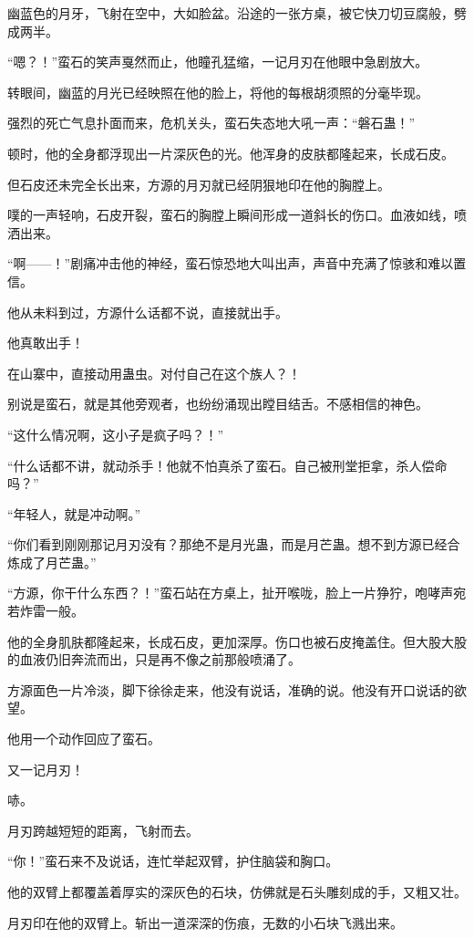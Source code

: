 \begin{this_body}
幽蓝色的月牙，飞射在空中，大如脸盆。沿途的一张方桌，被它快刀切豆腐般，劈成两半。

“嗯？！”蛮石的笑声戛然而止，他瞳孔猛缩，一记月刃在他眼中急剧放大。

转眼间，幽蓝的月光已经映照在他的脸上，将他的每根胡须照的分毫毕现。

强烈的死亡气息扑面而来，危机关头，蛮石失态地大吼一声：“磐石蛊！”

顿时，他的全身都浮现出一片深灰色的光。他浑身的皮肤都隆起来，长成石皮。

但石皮还未完全长出来，方源的月刃就已经阴狠地印在他的胸膛上。

噗的一声轻响，石皮开裂，蛮石的胸膛上瞬间形成一道斜长的伤口。血液如线，喷洒出来。

“啊——！”剧痛冲击他的神经，蛮石惊恐地大叫出声，声音中充满了惊骇和难以置信。

他从未料到过，方源什么话都不说，直接就出手。

他真敢出手！

在山寨中，直接动用蛊虫。对付自己在这个族人？！

别说是蛮石，就是其他旁观者，也纷纷涌现出瞠目结舌。不感相信的神色。

“这什么情况啊，这小子是疯子吗？！”

“什么话都不讲，就动杀手！他就不怕真杀了蛮石。自己被刑堂拒拿，杀人偿命吗？”

“年轻人，就是冲动啊。”

“你们看到刚刚那记月刃没有？那绝不是月光蛊，而是月芒蛊。想不到方源已经合炼成了月芒蛊。”

“方源，你干什么东西？！”蛮石站在方桌上，扯开喉咙，脸上一片狰狞，咆哮声宛若炸雷一般。

他的全身肌肤都隆起来，长成石皮，更加深厚。伤口也被石皮掩盖住。但大股大股的血液仍旧奔流而出，只是再不像之前那般喷涌了。

方源面色一片冷淡，脚下徐徐走来，他没有说话，准确的说。他没有开口说话的欲望。

他用一个动作回应了蛮石。

又一记月刃！

哧。

月刃跨越短短的距离，飞射而去。

“你！”蛮石来不及说话，连忙举起双臂，护住脑袋和胸口。

他的双臂上都覆盖着厚实的深灰色的石块，仿佛就是石头雕刻成的手，又粗又壮。

月刃印在他的双臂上。斩出一道深深的伤痕，无数的小石块飞溅出来。


\end{this_body}
